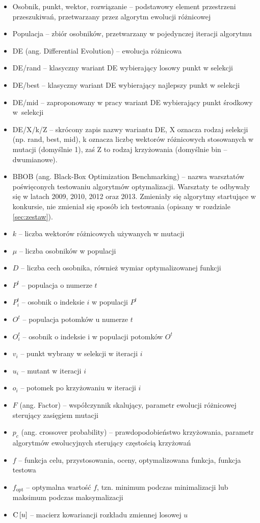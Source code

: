 \documentclass[a4paper,onecolumn,oneside,12pt,wide,floatssmall]{mwrep}
\def\C{{\rm C}\,}
\theoremstyle{definition}
\theoremstyle{plain}%
\theoremstyle{remark}
\begin{document}
\begin{itemize}
 \item[] Osobnik, punkt, wektor, rozwiązanie -- podstawowy element przestrzeni przeszukiwań, 
przetwarzany przez algorytm ewolucji różnicowej
 \item[] Populacja -- zbiór osobników, przetwarzany w pojedynczej iteracji algorytmu
 \item[] DE (ang. Differential Evolution) -- ewolucja różnicowa
 \item[] DE/rand -- klasyczny wariant DE wybierający losowy punkt w selekcji
 \item[] DE/best -- klasyczny wariant DE wybierający najlepszy punkt w selekcji
 \item[] DE/mid -- zaproponowany w pracy wariant DE wybierający punkt środkowy w~selekcji
 \item[] DE/X/k/Z -- skrócony zapis nazwy wariantu DE, X oznacza rodzaj selekcji (np. rand, best, mid), k oznacza liczbę wektorów różnicowych stosowanych
w mutacji (domyślnie 1), zaś Z to rodzaj krzyżowania (domyślnie bin -- dwumianowe).
 \item[] BBOB (ang. Black-Box Optimization Benchmarking) -- nazwa warsztatów poświęconych testowaniu algorytmów optymalizacji. 
Warsztaty te odbywały się w latach 2009, 2010, 2012 oraz 2013. Zmieniały się algorytmy startujące w konkursie, nie zmieniał
się sposób ich testowania (opisany w rozdziale \ref{sec:zestaw}).
 \item[] $k$ -- liczba wektorów różnicowych używanych w mutacji
 \item[] $\mu$ -- liczba osobników w populacji
 \item[] $D$ -- liczba cech osobnika, również wymiar optymalizowanej funkcji
 \item[] $P^t$ -- populacja o numerze $t$
 \item[] $P_i^t$ -- osobnik o indeksie $i$ w populacji $P^t$
 \item[] $O^t$ -- populacja potomków u numerze $t$
 \item[] $O_i^t$ -- osobnik o indeksie i w populacji potomków $O^t$
 \item[] $v_i$ -- punkt wybrany w selekcji w iteracji $i$
 \item[] $u_i$ -- mutant w iteracji $i$
 \item[] $o_i$ -- potomek po krzyżowaniu w iteracji $i$
 \item[] $F$ (ang. Factor) -- współczynnik skalujący, parametr ewolucji różnicowej sterujący zasięgiem mutacji
 \item[] $p_c$ (ang. crossover probability) -- prawdopodobieństwo krzyżowania, parametr algorytmów ewolucyjnych sterujący częstością krzyżowań
 \item[] $f$ -- funkcja celu, przystosowania, oceny, optymalizowana funkcja, funkcja testowa
 \item[] $f_\text{opt}$ -- optymalna wartość $f$, tzn. minimum podczas minimalizacji lub maksimum podczas maksymalizacji
 \item[] $\C[u]$ -- macierz kowariancji rozkładu zmiennej losowej $u$
\end{itemize}
\end{document}
